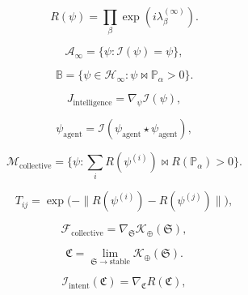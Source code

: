 \[
R(\psi)
=
\prod_{\beta}
\exp\!\left(i \lambda_\beta^{(\infty)}\right).
\]

\[
\mathcal{A}_\infty
=
\{\psi : \mathcal{I}(\psi) = \psi\},
\]

\[
\mathbb{B} =
\{\psi \in \mathcal{H}_\infty : \psi \bowtie \mathbb{P}_\alpha > 0\}.
\]

\[
J_{\mathrm{intelligence}}
=
\nabla_{\psi}\mathcal{I}(\psi),
\]

\[
\psi_{\mathrm{agent}}
=
\mathcal{I}(\psi_{\mathrm{agent}} \star \psi_{\mathrm{agent}}),
\]

\[
\mathcal{M}_{\mathrm{collective}}
=
\Big\{
\psi : 
\sum_i
R(\psi^{(i)}) \bowtie R(\mathbb{P}_\alpha) > 0
\Big\}.
\]

\[
T_{ij}
=
\exp\!\Big(
-\|R(\psi^{(i)}) - R(\psi^{(j)})\|
\Big),
\]

\[
\mathcal{F}_{\mathrm{collective}}
=
\nabla_{\mathfrak{S}}
\mathcal{K}_\oplus(\mathfrak{S}),
\]

\[
\mathfrak{C}
=
\lim_{\mathfrak{S}\to\text{stable}}
\mathcal{K}_\oplus(\mathfrak{S}).
\]

\[
\mathcal{I}_{\mathrm{intent}}(\mathfrak{C}) 
=
\nabla_{\mathfrak{C}} R(\mathfrak{C}),
\]

